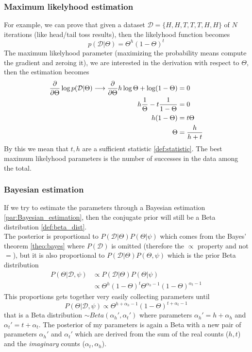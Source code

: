         \subsubsection{Maximum likelyhood estimation}
            For example, we can prove that given a dataset $\mathcal{D} = \{H, H, T, T, T, H, H\}$ of $N$ iterations (like head/tail toss results), then the likelyhood function becomes
            $$p(\mathcal{D}|\Theta) = \Theta^h(1-\Theta)^t$$
            The maximum likelyhood parameter (maximizing the probability means compute the gradient and zeroing it), we are interested in the derivation with respect to $\Theta$, then the estimation becomes
            \begin{align*}
                \pdv{}{\Theta} \log p(\mathcal{D}| \Theta) \longrightarrow \pdv{}{\Theta}h\log \Theta + \log(1-\Theta) &= 0\\
                h\frac{1}{\Theta} - t\frac{1}{1-\Theta} &= 0\\
                h(1-\Theta) &= t\Theta\\
                \Theta &= \frac{h}{h+t}
            \end{align*}
            By this we mean that $t, h$ are a sufficient statistic \ref{def:statistic}. The best maximum likelyhood parameters is the number of successes in the data among the total.
        
        \subsubsection{Bayesian estimation}
            If we try to estimate the parameters through a Bayesian estimation \ref{par:Bayesian_estimation}, then the conjugate prior will still be a Beta distribution \ref{def:beta_dist}.\\
            The posterior is proportional to $P(\mathcal{D}|\Theta)P(\Theta|\psi)$ which comes from the Bayes' theorem \ref{theo:bayes} where $P(\mathcal{D})$ is omitted (therefore the $\propto$ property and not $=$), but it is also proportional to $P(\mathcal{D}|\Theta)P(\Theta,\psi)$ which is the prior Beta distribution
            \begin{align*}
                P(\Theta|\mathcal{D}, \psi) &\propto P(\mathcal{D}|\Theta)P(\Theta|\psi)\\
                &\propto \Theta^h (1-\Theta)^t \Theta^{\alpha_h -1} (1-\Theta)^{\alpha_t -1}
            \end{align*}
            This proportions gets together very easily collecting parameters until
            $$P(\Theta|\mathcal{D},\psi) \propto \Theta^{h+\alpha_h -1} (1 - \Theta)^{t + \alpha_t -1}$$
            that is a Beta distribution $\sim Beta(\alpha_h ',\alpha_t ')$ where parameters $\alpha_h '= h+\alpha_h$ and $\alpha_t ' = t + \alpha_t$. 
            The posterior of my parameters is again a Beta with a new pair of parameters $\alpha_h '$ and $\alpha_t '$ which are derived from the sum of the real counts ($h, t$) and the \textit{imaginary} counts ($\alpha_t, \alpha_h$).\\
            

